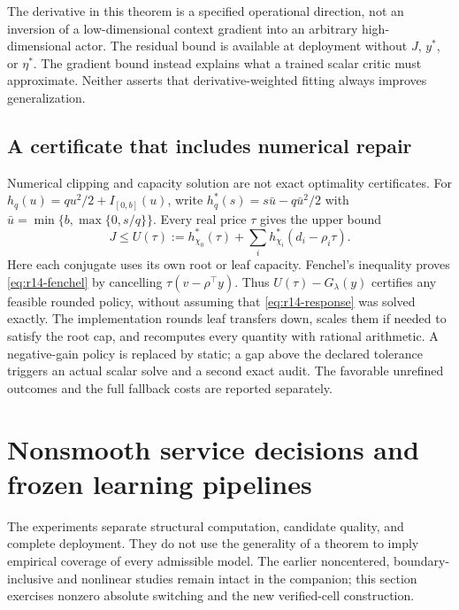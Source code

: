 \documentclass[11pt,letterpaper]{article}
\theoremstyle{definition}
\newcommand{\1}{\mathbf 1}
\begin{document}
The derivative in this theorem is a specified operational direction, not an inversion of a low-dimensional context gradient into an arbitrary high-dimensional actor. The residual bound is available at deployment without $J$, $y^*$, or $\eta^*$. The gradient bound instead explains what a trained scalar critic must approximate. Neither asserts that derivative-weighted fitting always improves generalization.

\subsection{A certificate that includes numerical repair}
Numerical clipping and capacity solution are not exact optimality certificates. For $h_q(u)=qu^2/2+I_{[0,b]}(u)$, write
$h_q^*(s)=s\bar u-q\bar u^2/2$ with $\bar u=\min\{b,\max\{0,s/q\}\}$. Every real price $\tau$ gives the upper bound
\begin{equation}\label{eq:r14-fenchel}
 J\leq U(\tau):=h_{\chi_0}^*(\tau)+\sum_i h_{\chi_i}^*(d_i-\rho_i\tau).
\end{equation}
Here each conjugate uses its own root or leaf capacity. Fenchel's inequality proves \eqref{eq:r14-fenchel} by cancelling $\tau(v-\rho^\top y)$. Thus $U(\tau)-G_\lambda(y)$ certifies any feasible rounded policy, without assuming that \eqref{eq:r14-response} was solved exactly. The implementation rounds leaf transfers down, scales them if needed to satisfy the root cap, and recomputes every quantity with rational arithmetic. A negative-gain policy is replaced by static; a gap above the declared tolerance triggers an actual scalar solve and a second exact audit. The favorable unrefined outcomes and the full fallback costs are reported separately.



\section{Nonsmooth service decisions and frozen learning pipelines}\label{sec:r13-experiment}
The experiments separate structural computation, candidate quality, and complete deployment. They do not use the generality of a theorem to imply empirical coverage of every admissible model. The earlier noncentered, boundary-inclusive and nonlinear studies remain intact in the companion; this section exercises nonzero absolute switching and the new verified-cell construction.
\end{document}

